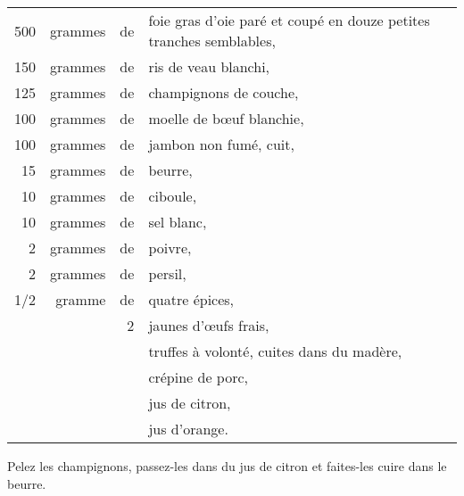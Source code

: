 \footnotesize
\begin{longtable}{rrrp{16em}}
    500 & grammes & de & foie gras d'oie paré et coupé en douze petites tranches semblables,              \\
    150 & grammes & de & ris de veau blanchi,                                                             \\
    125 & grammes & de & champignons de couche,                                                           \\
    100 & grammes & de & moelle de bœuf blanchie,                                                         \\
    100 & grammes & de & jambon non fumé, cuit,                                                           \\
     15 & grammes & de & beurre,                                                                          \\
     10 & grammes & de & ciboule,                                                                         \\
     10 & grammes & de & sel blanc,                                                                       \\
      2 & grammes & de & poivre,                                                                          \\
      2 & grammes & de & persil,                                                                          \\
    1/2 & gramme  & de & quatre épices,                                                                   \\
        &         &  2 & jaunes d'œufs frais,                                                             \\
        &         &    & truffes à volonté, cuites dans du madère,                                        \\
        &         &    & crépine de porc,                                                                 \\
        &         &    & jus de citron,                                                                   \\
        &         &    & jus d'orange.                                                                    \\
\end{longtable}
\normalsize

Pelez les champignons, passez-les dans du jus de citron et faites-les cuire
dans le beurre.

